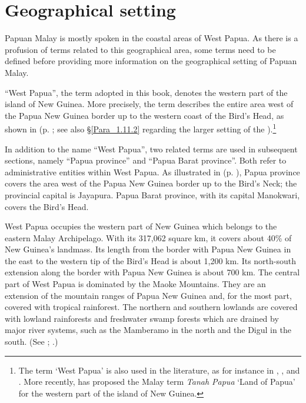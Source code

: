 \section{Geographical setting}\label{Para_1.1}
\largerpage
Papuan Malay is mostly spoken in the coastal areas of West Papua. As there is a profusion of terms related to this geographical area, some terms need to be defined before providing more information on the geographical setting of Papuan Malay.

 ``West Papua'', the term adopted in this book, denotes the western part of the island of New Guinea. More precisely, the term describes the entire area west of the Papua New Guinea border up to the western coast of the Bird’s Head, as shown in  (p. \pageref{Figure_0.1}; see also §\ref{Para_1.11.2} regarding the larger setting of the ).\footnote{The term ‘West Papua’ is also used in the literature, as for instance in \citet{King.2004}, \cite{Kingsbury.2002}, and \citet{Tebay.2005}. More recently, \citet{Gil.2014} has proposed the Malay term \textit{Tanah Papua} ‘Land of Papua’ for the western part of the island of New Guinea.}

In addition to the name  ``West Papua'', two related terms are used in subsequent sections, namely  ``Papua province'' and  ``Papua Barat province''. Both refer to administrative entities within West Papua. As illustrated in  (p. \pageref{Figure_0.2}), Papua province covers the area west of the Papua New Guinea border up to the Bird’s Neck; the provincial capital is Jayapura. Papua Barat province, with its capital Manokwari, covers the Bird’s Head.

West Papua occupies the western part of New Guinea which belongs to the eastern Malay Archipelago. With its 317,062 square km, it covers about 40\% of New Guinea’s landmass. Its length from the border with Papua New Guinea in the east to the western tip of the Bird’s Head is about 1,200 km. Its north-south extension along the border with Papua New Guinea is about 700 km. The central part of West Papua is dominated by the Maoke Mountains. They are an extension of the mountain ranges of Papua New Guinea and, for the most part, covered with tropical rainforest. The northern and southern lowlands are covered with lowland rainforests and freshwater swamp forests which are drained by major river systems, such as the Mamberamo in the north and the Digul in the south. (See \citealt{EncyclopaediaBritannica.2001b}; \citeyear*{EncyclopaediaBritannica.2001}.)

